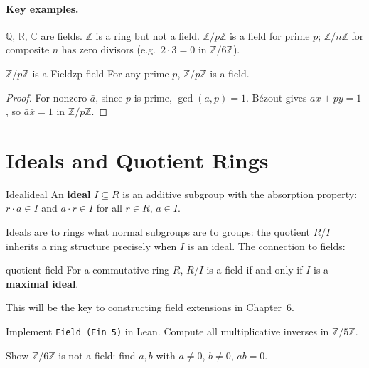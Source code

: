 \documentclass[11pt, a4paper, oneside]{book}
\newcommand{\Z}{\mathbb{Z}}
\newcommand{\Q}{\mathbb{Q}}
\newcommand{\R}{\mathbb{R}}
\newcommand{\C}{\mathbb{C}}
\newcommand{\lc}[1]{\texttt{#1}}
\newcounter{exercise}[chapter]
\begin{document}
\paragraph{Key examples.} $\Q$, $\R$, $\C$ are fields. $\Z$ is a ring but not
a field. $\Z/p\Z$ is a field for prime $p$; $\Z/n\Z$ for composite $n$ has
zero divisors (e.g.\ $2 \cdot 3 = 0$ in $\Z/6\Z$).

\begin{thm}{$\Z/p\Z$ is a Field}{zp-field}
For any prime $p$, $\Z/p\Z$ is a field.
\end{thm}

\begin{proof}
For nonzero $\bar{a}$, since $p$ is prime, $\gcd(a,p) = 1$. Bézout gives
$ax + py = 1$, so $\bar{a}\bar{x} = \bar{1}$ in $\Z/p\Z$.
\end{proof}

\section{Ideals and Quotient Rings}

\begin{defn}{Ideal}{ideal}
An \textbf{ideal} $I \subseteq R$ is an additive subgroup with the absorption
property: $r \cdot a \in I$ and $a \cdot r \in I$ for all $r \in R$, $a \in I$.
\end{defn}

Ideals are to rings what normal subgroups are to groups: the quotient
$R/I$ inherits a ring structure precisely when $I$ is an ideal. The connection
to fields:

\begin{thm}{}{quotient-field}
For a commutative ring $R$, $R/I$ is a field if and only if $I$ is a
\textbf{maximal ideal}.
\end{thm}

This will be the key to constructing field extensions in Chapter~6.

\begin{exercisebox}[title={Exercise 4.1}]
Implement \lc{Field (Fin 5)} in Lean. Compute all multiplicative inverses
in $\Z/5\Z$.
\end{exercisebox}

\begin{exercisebox}[title={Exercise 4.2}]
Show $\Z/6\Z$ is not a field: find $a, b$ with $a \neq 0$, $b \neq 0$,
$ab = 0$.
\end{exercisebox}

\end{document}
